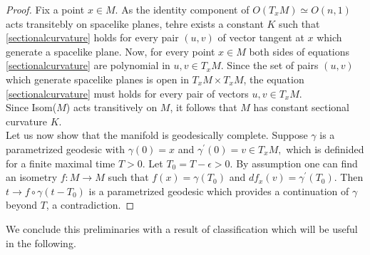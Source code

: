 
\begin{proof}
    Fix a point $x\in M$. As the identity component of $O(T_x M)\simeq O(n,1)$ acts transitebly on spacelike planes, tehre exists a constant $K$ such that \ref{sectionalcurvature} holds for every pair $(u,v)$ of vector tangent at $x$ which generate a spacelike plane. Now, for every point $x\in M$ both sides of equations \ref{sectionalcurvature} are polynomial in $u,v \in T_xM$. Since the set of pairs $(u,v)$ which generate spacelike planes is open in $T_{x}M\times T_{x}M$, the equation \ref{sectionalcurvature} must holds for every pair of vectors $u,v \in T_xM$.\\ Since Isom($M$) acts transitively on $M$, it follows that $M$ has constant sectional curvature $K$.\\
    Let us now show that the manifold is geodesically complete. Suppose $\gamma$ is a parametrized geodesic with $\gamma(0)=x$ and $\gamma^{\prime} (0)=v\in T_xM,$ which is definided for a finite maximal time $T>0.$ Let $T_0=T-\epsilon>0.$ By assumption one can find an isometry $f:M\to M$ such that $f(x)=\gamma(T_0)$ and $df_x(v)=\gamma^{\prime}(T_0).$ Then $t\to f\circ\gamma(t-T_0)$ is a parametrized geodesic which provides a continuation of $\gamma$ beyond $T$, a contradiction. 
\end{proof}

We conclude this preliminaries with a result of classification which will be useful in the following.
\begin{proposition}\label{classification}
    
\end{proposition}

\subsection{}